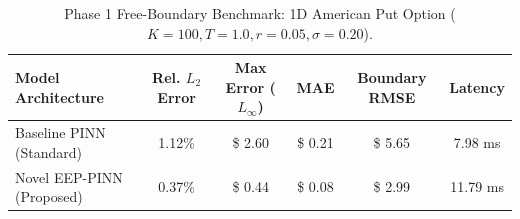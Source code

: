 \begin{table}[h!]
\centering
\small
\caption{Phase 1 Free-Boundary Benchmark: 1D American Put Option ($K=100, T=1.0, r=0.05, \sigma=0.20$).}
\label{tab:pinn_benchmarks}
\begin{tabular}{@{}lccccc@{}}
\toprule
\textbf{Model Architecture} & \textbf{Rel. $L_2$ Error} & \textbf{Max Error ($L_\infty$)} & \textbf{MAE} & \textbf{Boundary RMSE} & \textbf{Latency} \\ \midrule
Baseline PINN (Standard) & 1.12\% & \$ 2.60 & \$ 0.21 & \$ 5.65 & 7.98 ms \\
Novel EEP-PINN (Proposed) & 0.37\% & \$ 0.44 & \$ 0.08 & \$ 2.99 & 11.79 ms \\
\bottomrule
\end{tabular}
\end{table}

